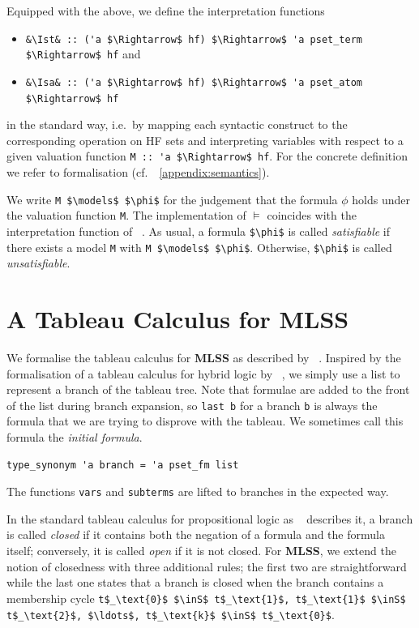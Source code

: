 \documentclass[runningheads]{llncs}
\newcommand{\MLSS}{\textbf{MLSS}}
\newcommand{\inS}{\in_\text{s}}
\newcommand{\Ist}{I$_\text{st}$}
\newcommand{\Isa}{I$_\text{sa}$}
\begin{document}
Equipped with the above, we define the interpretation functions 
\begin{itemize}
  \item \lstinline!&\Ist& :: ('a $\Rightarrow$ hf) $\Rightarrow$ 'a pset_term $\Rightarrow$ hf! and 
  \item \lstinline!&\Isa& :: ('a $\Rightarrow$ hf) $\Rightarrow$ 'a pset_atom $\Rightarrow$ hf!
\end{itemize}
in the standard way, i.e.\ by mapping each syntactic construct to the corresponding operation on HF sets and interpreting variables with respect to a given valuation function \lstinline!M :: 'a $\Rightarrow$ hf!.
For the concrete definition we refer to formalisation (cf.\ \appendixname~\ref{appendix:semantics}).

We write \lstinline!M $\models$ $\phi$! for the judgement that the formula $\phi$ holds under the valuation function \lstinline!M!.
The implementation of $\models$ coincides with the interpretation function of \citeauthor{lqe}~\cite{lqe}.
As usual, a formula \lstinline!$\phi$! is called \emph{satisfiable} if there exists a model \lstinline!M! with \lstinline!M $\models$ $\phi$!.
Otherwise, \lstinline!$\phi$! is called \emph{unsatisfiable}.

\section{A Tableau Calculus for MLSS}
We formalise the tableau calculus for \MLSS{} as described by \citeauthor{new_fast_tableau}~\cite{new_fast_tableau}.
Inspired by the formalisation of a tableau calculus for hybrid logic by \citeauthor{hybrid_logic_afp}~\cite{hybrid_logic_afp}, we simply use a list to represent a branch of the tableau tree.
Note that formulae are added to the front of the list during branch expansion, so \lstinline!last b! for a branch \lstinline!b! is always the formula that we are trying to disprove with the tableau.
We sometimes call this formula the \emph{initial formula}.
\begin{lstlisting}
type_synonym 'a branch = 'a pset_fm list
\end{lstlisting}

\noindent The functions \lstinline!vars! and \lstinline!subterms! are lifted to branches in the expected way.

In the standard tableau calculus for propositional logic as \citeauthor{tableau}~\cite{tableau} describes it, a branch is called \emph{closed} if it contains both the negation of a formula and the formula itself;
conversely, it is called \emph{open} if it is not closed.
For \MLSS{}, we extend the notion of closedness with three additional rules; the first two are straightforward while the last one states that a branch is closed when the branch contains a membership cycle
\lstinline!t$_\text{0}$ $\inS$ t$_\text{1}$, t$_\text{1}$ $\inS$ t$_\text{2}$, $\ldots$, t$_\text{k}$ $\inS$ t$_\text{0}$!.
\end{document}
